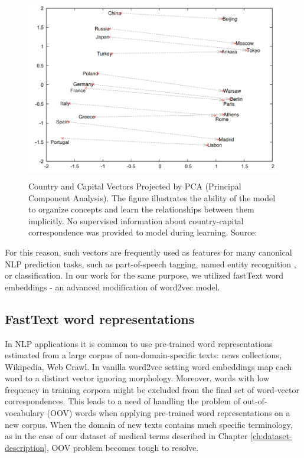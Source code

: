 \begin{figure}[h]
    \centering
    \includegraphics[height=8cm]{Images/word2vec-property.png}
    \caption{Country and Capital Vectors Projected by PCA (Principal Component Analysis). The figure illustrates the ability of the model to organize concepts and learn the relationships between them implicitly. No supervised information about country-capital correspondence was provided to model during learning. Source: \citep{Mikolov-NIPS2013}}
    \label{fig:word2vec-property}
\end{figure} 
%
For this reason, such vectors are frequently used as features for many canonical NLP prediction tasks, such as part-of-speech tagging, named entity recognition \citep{Collobert:DBLP}, or classification. In our work for the same purpose, we utilized fastText word embeddings - an advanced modification of word2vec model.

\subsection{FastText word representations}
In NLP applications it is common to use pre-trained word representations estimated from a large corpus of non-domain-specific texts: news collections, Wikipedia, Web Crawl. In vanilla word2vec setting word embeddings map each word to a distinct vector ignoring morphology. Moreover, words with low frequency in training corpora might be excluded from the final set of word-vector correspondences. This leads to a need of handling the problem of out-of-vocabulary (OOV) words when applying pre-trained word representations on a new corpus. When the domain of new texts contains much specific terminology, as in the case of our dataset of medical terms described in Chapter \ref{ch:dataset-description}, OOV problem becomes tough to resolve.

